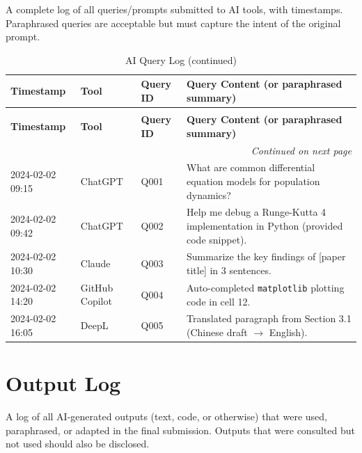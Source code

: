 \documentclass[12pt, a4paper]{article}
\begin{document}
A complete log of all queries/prompts submitted to AI tools, with
timestamps. Paraphrased queries are acceptable but must capture the
intent of the original prompt.

\begin{longtable}{p{2.5cm} p{2.5cm} p{1.5cm} p{8cm}}
\caption{AI Query Log} \\
\toprule
\textbf{Timestamp} & \textbf{Tool} & \textbf{Query ID} & \textbf{Query Content (or paraphrased summary)} \\
\midrule
\endfirsthead

\caption[]{AI Query Log (continued)} \\
\toprule
\textbf{Timestamp} & \textbf{Tool} & \textbf{Query ID} & \textbf{Query Content (or paraphrased summary)} \\
\midrule
\endhead

\midrule
\multicolumn{4}{r}{\textit{Continued on next page}} \\
\endfoot

\bottomrule
\endlastfoot

2024-02-02 09:15 & ChatGPT & Q001 & What are common differential equation models for population dynamics? \\
2024-02-02 09:42 & ChatGPT & Q002 & Help me debug a Runge-Kutta 4 implementation in Python (provided code snippet). \\
2024-02-02 10:30 & Claude & Q003 & Summarize the key findings of [paper title] in 3 sentences. \\
2024-02-02 14:20 & GitHub Copilot & Q004 & Auto-completed \texttt{matplotlib} plotting code in cell 12. \\
2024-02-02 16:05 & DeepL & Q005 & Translated paragraph from Section 3.1 (Chinese draft $\to$ English). \\

\end{longtable}

\section{Output Log}

A log of all AI-generated outputs (text, code, or otherwise) that
were used, paraphrased, or adapted in the final submission. Outputs
that were consulted but not used should also be disclosed.
\end{document}
